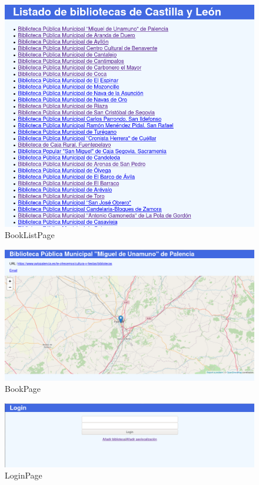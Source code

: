 \documentclass[openright,twoside,12pt]{book}
\begin{document}
\begin{figure}
    \centering
    \includegraphics[width=\textwidth]{tour/bibliocyl2.png}
    \caption{BookListPage}
    \label{fig:bibliocyl2}
\end{figure}

\begin{figure}
    \centering
    \includegraphics[width=\textwidth]{tour/bibliocyl3.png}
    \caption{BookPage}
    \label{fig:bibliocyl3}
\end{figure}

\begin{figure}
    \centering
    \includegraphics[width=\textwidth]{tour/bibliocyl4.png}
    \caption{LoginPage}
    \label{fig:bibliocyl4}
\end{figure}
\end{document}

